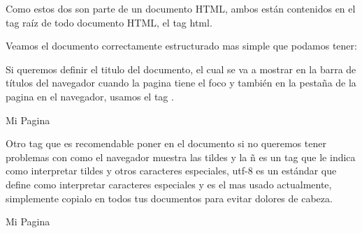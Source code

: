 \documentclass[letterpaper,10pt,spanish]{sphinxmanual}
\begin{document}
Como estos dos son parte de un documento HTML, ambos están contenidos en el tag
raíz de todo documento HTML, el tag html.

Veamos el documento correctamente estructurado mas simple que podamos tener:

%
\begin{sphinxVerbatim}[commandchars=\\\{\}]
\end{sphinxVerbatim}

Si queremos definir el titulo del documento, el cual se va a mostrar en la
barra de títulos del navegador cuando la pagina tiene el foco y también en la
pestaña de la pagina en el navegador, usamos el tag .

%
\begin{sphinxVerbatim}[commandchars=\\\{\}]
        Mi Pagina

\end{sphinxVerbatim}

Otro tag que es recomendable poner en el documento si no queremos tener
problemas con como el navegador muestra las tildes y la ñ es un tag que le
indica como interpretar tildes y otros caracteres especiales, utf-8 es un
estándar que define como interpretar caracteres especiales y es el mas usado
actualmente, simplemente copialo en todos tus documentos para evitar dolores de
cabeza.

%
\begin{sphinxVerbatim}[commandchars=\\\{\}]
         
        Mi Pagina

\end{sphinxVerbatim}
\end{document}
